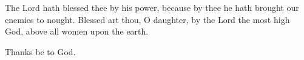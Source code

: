 
The Lord hath blessed thee by his power, because by thee he hath brought our enemies to nought. Blessed art thou, O daughter, by the Lord the most high God, above all women upon the earth.

\rubric{\Rbar}Thanks be to God.
